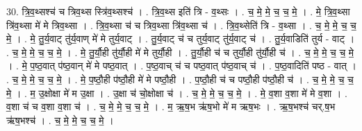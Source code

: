 \documentclass[17pt]{extarticle}
\begin{document}
30. त्रि॒व॒थ्सश्च॑ च त्रिव॒थ्स स्त्रि॑व॒थ्सश्च॑ । . त्रि॒व॒थ्स इति॑ त्रि - व॒थ्सः । . च॒ मे॒ मे॒ च॒ च॒ मे॒ । . मे॒ त्रि॒व॒थ्सा त्रि॑व॒थ्सा मे॑ मे त्रिव॒थ्सा । . त्रि॒व॒थ्सा च॑ च त्रिव॒थ्सा त्रि॑व॒थ्सा च॑ । . त्रि॒व॒थ्सेति॑ त्रि - व॒थ्सा । . च॒ मे॒ मे॒ च॒ च॒ मे॒ । . मे॒ तु॒र्य॒वाट् तु॑र्य॒वाण् मे॑ मे तुर्य॒वाट् । . तु॒र्य॒वाट् च॑ च तुर्य॒वाट् तु॑र्य॒वाट् च॑ । . तु॒र्य॒वाडिति॑ तुर्य - वाट् । . च॒ मे॒ मे॒ च॒ च॒ मे॒ । . मे॒ तु॒र्यौ॒ही तु॑र्यौ॒ही मे॑ मे तुर्यौ॒ही । . तु॒र्यौ॒ही च॑ च तुर्यौ॒ही तु॑र्यौ॒ही च॑ । . च॒ मे॒ मे॒ च॒ च॒ मे॒ । . मे॒ प॒ष्ठ॒वात् प॑ष्ठ॒वान् मे॑ मे पष्ठ॒वात् । . प॒ष्ठ॒वाच् च॑ च पष्ठ॒वात् प॑ष्ठ॒वाच् च॑ । . प॒ष्ठ॒वादिति॑ पष्ठ - वात् । . च॒ मे॒ मे॒ च॒ च॒ मे॒ । . मे॒ प॒ष्ठौ॒ही प॑ष्ठौ॒ही मे॑ मे पष्ठौ॒ही । . प॒ष्ठौ॒ही च॑ च पष्ठौ॒ही प॑ष्ठौ॒ही च॑ । . च॒ मे॒ मे॒ च॒ च॒ मे॒ । . म॒ उ॒क्षोक्षा मे॑ म उ॒क्षा । . उ॒क्षा च॑ चो॒क्षोक्षा च॑ । . च॒ मे॒ मे॒ च॒ च॒ मे॒ । . मे॒ व॒शा व॒शा मे॑ मे व॒शा । . व॒शा च॑ च व॒शा व॒शा च॑ । . च॒ मे॒ मे॒ च॒ च॒ मे॒ । . म॒ ऋ॒ष॒भ ऋ॑ष॒भो मे॑ म ऋष॒भः । . ऋ॒ष॒भश्च॑ चर्.ष॒भ ऋ॑ष॒भश्च॑ । . च॒ मे॒ मे॒ च॒ च॒ मे॒ । \newline
\end{document}
